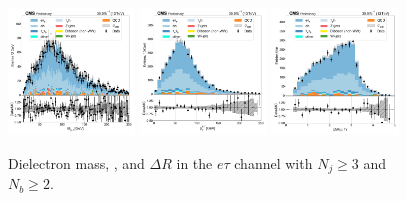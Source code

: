 \begin{figure}[htb!]
    \centering
    \includegraphics[width=0.3\textwidth]{chapters/Analysis/sectionPlots/figures/data_mc_overlays/etau_2016_cat_gt3_gt2_signal_linear_lepton_dilepton1_mass}
    \includegraphics[width=0.3\textwidth]{chapters/Analysis/sectionPlots/figures/data_mc_overlays/etau_2016_cat_gt3_gt2_signal_linear_lepton_dilepton1_pt}
    \includegraphics[width=0.3\textwidth]{chapters/Analysis/sectionPlots/figures/data_mc_overlays/etau_2016_cat_gt3_gt2_signal_linear_lepton_dilepton1_delta_r}
    \caption{Dielectron mass, \pt, and $\Delta R$ in the $e\tau$ channel
        with $N_{j} \geq 3$ and $N_{b} \geq 2$.}
    \label{fig:analysis:plots:etau_8_dilepton}
\end{figure}

